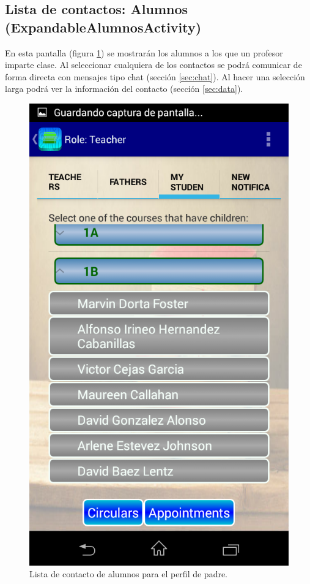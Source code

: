		\subsection{Lista de contactos: Alumnos (ExpandableAlumnosActivity)}
		
			En esta pantalla (figura \ref{fig:profeAlu}) se mostrarán los alumnos a los que un profesor imparte clase. Al seleccionar cualquiera de los contactos se podrá comunicar de forma directa con mensajes tipo chat (sección \ref{sec:chat}). Al hacer una selección larga podrá ver la información del contacto (sección \ref{sec:data}).
		
			\begin{figure}[h !]
				\centering
				\includegraphics[scale=0.2]{Imagenes/App/profeAlu}
				\caption{Lista de contacto de alumnos para el perfil de padre.}
				\label{fig:profeAlu}
			\end{figure}
		
